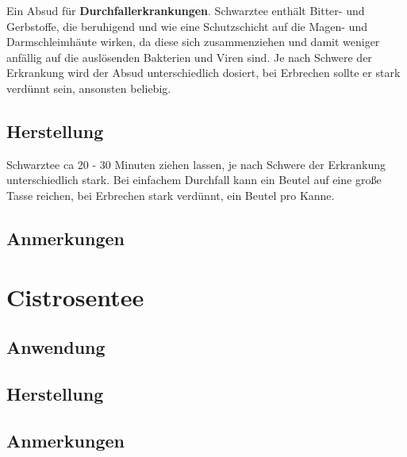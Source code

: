 Ein Absud für \textbf{Durchfallerkrankungen}. Schwarztee enthält Bitter- und Gerbstoffe, die beruhigend und wie eine Schutzschicht auf die Magen- und Darmschleimhäute wirken, da diese sich zusammenziehen und damit weniger anfällig auf die auslösenden Bakterien und Viren sind. Je nach Schwere der Erkrankung wird der Absud unterschiedlich dosiert, bei Erbrechen sollte er stark verdünnt sein, ansonsten beliebig.

\subsection{Herstellung}

Schwarztee ca 20 - 30 Minuten ziehen lassen, je nach Schwere der Erkrankung unterschiedlich stark. Bei einfachem Durchfall kann ein Beutel auf eine große Tasse reichen, bei Erbrechen stark verdünnt, ein Beutel pro Kanne.

\subsection{Anmerkungen}





\section{Cistrosentee}

\subsection{Anwendung}

\subsection{Herstellung}

\subsection{Anmerkungen}


